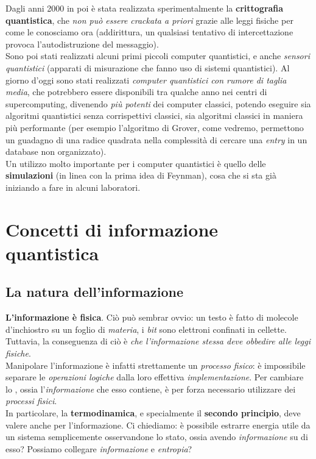 \documentclass[../../InformazioneQuantistica.tex]{subfiles}
\begin{document}
Dagli anni 2000 in poi è stata realizzata sperimentalmente la \textbf{crittografia quantistica}, che \textit{non può essere crackata a priori} grazie alle leggi fisiche per come le conosciamo ora (addirittura, un qualsiasi tentativo di intercettazione provoca l'autodistruzione del messaggio).\\
Sono poi stati realizzati alcuni primi piccoli computer quantistici, e anche \textit{sensori quantistici} (apparati di misurazione che fanno uso di sistemi quantistici). Al giorno d'oggi sono stati realizzati \textit{computer quantistici con rumore di taglia media}, che potrebbero essere disponibili tra qualche anno nei centri di supercomputing, divenendo \textit{più potenti} dei computer classici, potendo eseguire sia algoritmi quantistici senza corrispettivi classici, sia algoritmi classici in maniera più performante (per esempio l'algoritmo di Grover, come vedremo, permettono un guadagno di una radice quadrata nella complessità di cercare una \textit{entry} in un database non organizzato).\\
Un utilizzo molto importante per i computer quantistici è quello delle \textbf{simulazioni} (in linea con la prima idea di Feynman), cosa che si sta già iniziando a fare in alcuni laboratori.

\section{Concetti di informazione quantistica}
\subsection{La natura dell'informazione}
\textbf{L'informazione è fisica}. Ciò può sembrar ovvio: un testo è fatto di molecole d'inchiostro su un foglio di \textit{materia}, i \textit{bit} sono elettroni confinati in cellette. Tuttavia, la conseguenza di ciò è \textit{che l'informazione stessa deve obbedire alle leggi fisiche}.\\ Manipolare l'informazione è infatti strettamente un \textit{processo fisico}: è impossibile separare le \textit{operazioni logiche} dalla loro effettiva \textit{implementazione}. Per cambiare lo , ossia l'\textit{informazione} che esso contiene, è per forza necessario utilizzare dei \textit{processi fisici}.\\

In particolare, la \textbf{termodinamica}, e specialmente il \textbf{secondo principio}, deve valere anche per l'informazione. Ci chiediamo: è possibile estrarre energia utile da un sistema semplicemente osservandone lo stato, ossia avendo \textit{informazione} su di esso? \cite{landauer} Possiamo collegare \textit{informazione} e \textit{entropia}?\\
\end{document}
